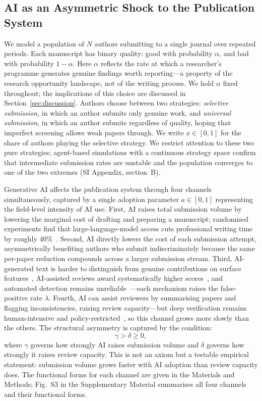 \documentclass{article}
\begin{document}
\subsection{AI as an Asymmetric Shock to the Publication System}
\label{sec:model_summary}

We model a population of $N$ authors submitting to a single journal over repeated periods.
Each manuscript has binary quality: good with probability $\alpha$, and bad with probability $1-\alpha$.
Here $\alpha$ reflects the rate at which a researcher's programme generates genuine findings worth reporting---a property of the research opportunity landscape, not of the writing process.
We hold $\alpha$ fixed throughout; the implications of this choice are discussed in Section~\ref{sec:discussion}.
Authors choose between two strategies: \emph{selective submission}, in which an author submits only genuine work, and \emph{universal submission}, in which an author submits regardless of quality, hoping that imperfect screening allows weak papers through.
We write $x \in [0,1]$ for the share of authors playing the selective strategy.
We restrict attention to these two pure strategies; agent-based simulations with a continuous strategy space confirm that intermediate submission rates are unstable and the population converges to one of the two extremes (SI Appendix, section~B).

Generative AI affects the publication system through four channels simultaneously, captured by a single adoption parameter $a \in [0,1]$ representing the field-level intensity of AI use.
First, AI raises total submission volume by lowering the marginal cost of drafting and preparing a manuscript; randomised experiments find that large-language-model access cuts professional writing time by roughly 40\%~\citep{NoyZhang2023, StokelWalker2023}.
Second, AI directly lowers the cost of each submission attempt, asymmetrically benefiting authors who submit indiscriminately because the same per-paper reduction compounds across a larger submission stream.
Third, AI-generated text is harder to distinguish from genuine contributions on surface features~\citep{StokelWalker2023}, AI-assisted reviews award systematically higher scores~\citep{Latona2024, Liang2024ICML}, and automated detection remains unreliable~\citep{Liang2023detectors}---each mechanism raises the false-positive rate $\lambda$.
Fourth, AI can assist reviewers by summarising papers and flagging inconsistencies, raising review capacity---but deep verification remains human-intensive and policy-restricted~\citep{Naddaf2025}, so this channel grows more slowly than the others.
The structural asymmetry is captured by the condition:
\begin{equation}
    \label{eq:asymmetry}
    \gamma > \delta \geq 0,
\end{equation}
where $\gamma$ governs how strongly AI raises submission volume and $\delta$ governs how strongly it raises review capacity.
This is not an axiom but a testable empirical statement: submission volume grows faster with AI adoption than review capacity does.
The functional forms for each channel are given in the Materials and Methods; Fig.~S3 in the Supplementary Material summarises all four channels and their functional forms.
\end{document}
